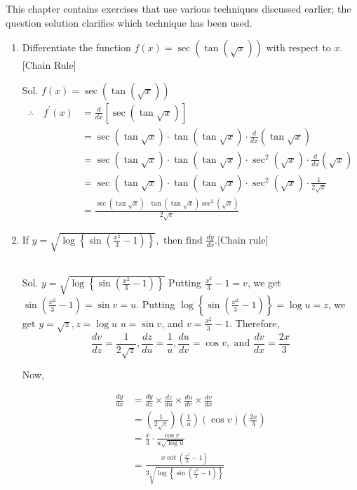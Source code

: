 
This chapter contains exercises that use various techniques discussed earlier; the question solution clarifies which technique has been used. 

\begin{enumerate}
    \item Differentiate the function $f(x)=\sec (\tan (\sqrt{x}))$ with respect to $x$.[Chain Rule]

    \begin{outline}
        Sol. $f(x)=\sec (\tan (\sqrt{x}))$
$$
\begin{aligned}
\therefore \quad f^{\prime}(x) & =\frac{d}{d x}[\sec (\tan \sqrt{x})] \\
& =\sec (\tan \sqrt{x}) \cdot \tan (\tan \sqrt{x}) \cdot \frac{d}{d x}(\tan \sqrt{x}) \\
& =\sec (\tan \sqrt{x}) \cdot \tan (\tan \sqrt{x}) \cdot \sec ^2(\sqrt{x}) \cdot \frac{d}{d x}(\sqrt{x}) \\
& =\sec (\tan \sqrt{x}) \cdot \tan (\tan \sqrt{x}) \cdot \sec ^2(\sqrt{x}) \cdot \frac{1}{2 \sqrt{x}} \\
& =\frac{\sec (\tan \sqrt{x}) \cdot \tan (\tan \sqrt{x}) \sec ^2(\sqrt{x})}{2 \sqrt{x}}
\end{aligned}
$$
    \end{outline}



\item If $y=\sqrt{\log \left\{\sin \left(\frac{x^2}{3}-1\right)\right\}}, \text { then find } \frac{d y}{d x}$.[Chain rule]\\\\

\begin{outline}
    Sol. $y=\sqrt{\log \left\{\sin \left(\frac{x^2}{3}-1\right)\right\}}$
Putting $\frac{x^2}{3}-1=v$, we get $\sin \left(\frac{x^2}{3}-1\right)=\sin v=u$.
Putting $\log \left\{\sin \left(\frac{x^2}{3}-1\right)\right\}=\log u=z$, we get $y=\sqrt{z}, z=\log u$ $u=\sin v$, and $v=\frac{x^2}{3}-1$. Therefore,
$$
\frac{d v}{d z} =\frac{1}{2 \sqrt{z}}, \frac{d z}{d u}=\frac{1}{u}, \frac{d u}{d v}=\cos v, \text { and } \frac{d v}{d x}=\frac{2 x}{3}
$$

Now,

$$
\begin{aligned}
\frac{d y}{d x} & =\frac{d y}{d z} \times \frac{d z}{d u} \times \frac{d u}{d v} \times \frac{d v}{d x} \\
& =\left(\frac{1}{2 \sqrt{z}}\right)\left(\frac{1}{u}\right)(\cos v)\left(\frac{2 x}{3}\right) \\
& =\frac{x}{3} \cdot \frac{\cos v}{u \sqrt{\log u}} \\
& =\frac{x \cot \left(\frac{x^2}{3}-1\right)}{3 \sqrt{\log \left\{\sin \left(\frac{x^2}{3}-1\right)\right\}}}
\end{aligned}
$$
\end{outline}





\end{enumerate}
